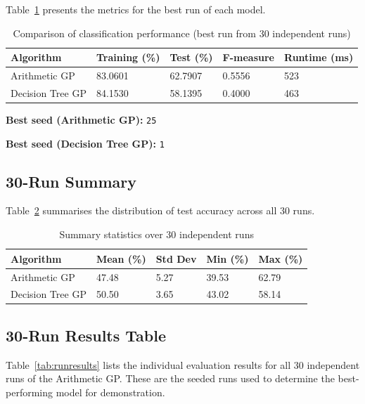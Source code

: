 \documentclass[12pt,a4paper]{article}
\begin{document}
Table~\ref{tab:results} presents the metrics for the best run of each model.

\begin{table}[H]
\centering
\caption{Comparison of classification performance (best run from 30 independent runs)}
\label{tab:results}
\begin{tabular}{lllll}
\toprule
\textbf{Algorithm}   & \textbf{Training (\%)} & \textbf{Test (\%)} & \textbf{F-measure} & \textbf{Runtime (ms)} \\
\midrule
Arithmetic GP        & 83.0601                & 62.7907            & 0.5556             & 523 \\
Decision Tree GP     & 84.1530                & 58.1395            & 0.4000             & 463 \\
\bottomrule
\end{tabular}
\end{table}

\noindent\textbf{Best seed (Arithmetic GP):} \texttt{25}

\noindent\textbf{Best seed (Decision Tree GP):} \texttt{1}

\subsection{30-Run Summary}

Table~\ref{tab:runs} summarises the distribution of test accuracy across all 30 runs.

\begin{table}[H]
\centering
\caption{Summary statistics over 30 independent runs}
\label{tab:runs}
\begin{tabular}{lllll}
\toprule
\textbf{Algorithm}  & \textbf{Mean (\%)} & \textbf{Std Dev} & \textbf{Min (\%)} & \textbf{Max (\%)} \\
\midrule
Arithmetic GP       & 47.48 & 5.27 & 39.53 & 62.79 \\
Decision Tree GP    & 50.50 & 3.65 & 43.02 & 58.14 \\
\bottomrule
\end{tabular}
\end{table}

\subsection{30-Run Results Table}

Table~\ref{tab:runresults} lists the individual evaluation results for all 30 independent runs of the Arithmetic GP. These are the seeded runs used to determine the best-performing model for demonstration.
\end{document}
